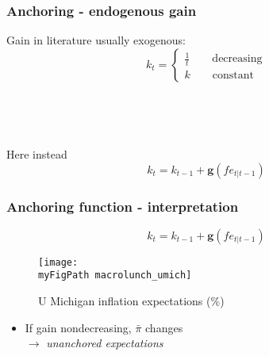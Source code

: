 \documentclass[11pt]{beamer}
\def \myFigPath {../../figures/}
\begin{document}
\begin{frame}
	\frametitle{Anchoring - endogenous gain}
	\label{anchoring1}


Gain in literature usually exogenous: 
\begin{equation*}
k_t = \begin{cases}\frac{1}{t} \quad \quad \text{decreasing}\\
k \quad \quad \text{constant}
\end{cases}
\end{equation*}

\

\

Here instead
\begin{equation}
k_t = k_{t-1} + \mathbf{g}(fe_{t|t-1}) \label{gain}
\end{equation}


\vfill 

\hyperlink{g}{}



\end{frame}

\begin{frame}
	\frametitle{Anchoring function - interpretation}
	\label{anchoring_function}
	
\begin{equation*}
k_t = k_{t-1} + \mathbf{g}(fe_{t|t-1}) 
\end{equation*}

\begin{figure}[h!]
\caption{U Michigan inflation expectations (\%)}
\texttt{[image: \\myFigPath macrolunch\_umich]}
\end{figure}

\begin{itemize}
\item If gain nondecreasing, $\bar{\pi}$ changes \\
$\rightarrow$ \emph{unanchored expectations}

\

\end{itemize}



\end{frame}
\end{document}
